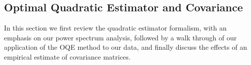 \documentclass[twocolumn,numberedappendix]{emulateapj} \shorttitle{PSA64}
\begin{document}
\subsection{Optimal Quadratic Estimator and Covariance}\label{sec:oqe}
In this section we first
review the quadratic estimator formalism, with an emphasis on our power
spectrum analysis, followed by a walk through of our application of the OQE
method to our data, and finally discuss the effects of an empirical estimate of
covariance matrices.
\end{document}

